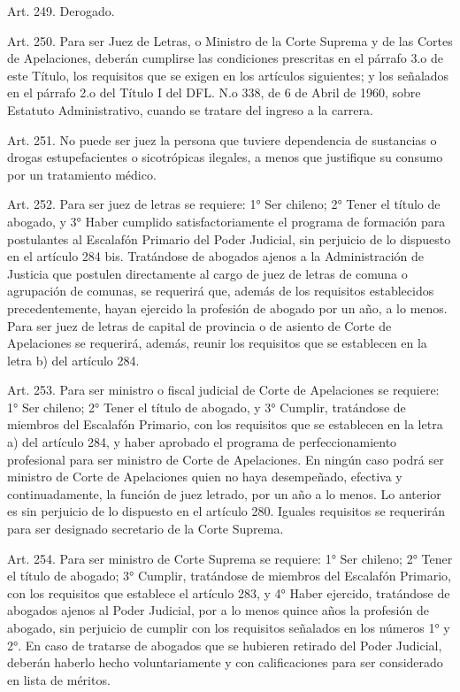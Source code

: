     Art. 249. Derogado.


    Art. 250. Para ser Juez de Letras, o Ministro de la Corte Suprema y de las Cortes de Apelaciones, deberán cumplirse las condiciones prescritas en el párrafo 3.o de este Título, los requisitos que se exigen en los artículos siguientes; y los señalados en el párrafo 2.o del Título I del DFL. N.o 338, de 6 de Abril de 1960, sobre Estatuto Administrativo, cuando se tratare del ingreso a la carrera.



    Art. 251. No puede ser juez la persona que tuviere dependencia de sustancias o drogas estupefacientes o sicotrópicas ilegales, a menos que justifique su consumo por un tratamiento médico.


    Art. 252. Para ser juez de letras se requiere:
    1° Ser chileno;
    2° Tener el título de abogado, y
    3° Haber cumplido satisfactoriamente el programa de formación para postulantes al Escalafón Primario del Poder Judicial, sin perjuicio de lo dispuesto en el artículo 284 bis.
    Tratándose de abogados ajenos a la Administración de Justicia que postulen directamente al cargo de juez de letras de comuna o agrupación de comunas, se requerirá que, además de los requisitos establecidos precedentemente, hayan ejercido la profesión de abogado por un año, a lo menos.
    Para ser juez de letras de capital de provincia o de asiento de Corte de Apelaciones se requerirá, además, reunir los requisitos que se establecen en la letra b) del artículo 284.


    Art. 253. Para ser ministro o fiscal judicial de Corte de Apelaciones se requiere:
    1° Ser chileno;
    2° Tener el título de abogado, y
    3° Cumplir, tratándose de miembros del Escalafón Primario, con los requisitos que se establecen en la letra a) del artículo 284, y haber aprobado el programa de perfeccionamiento profesional para ser ministro de Corte de Apelaciones. En ningún caso podrá ser ministro de Corte de Apelaciones quien no haya desempeñado, efectiva y continuadamente, la función de juez letrado, por un año a lo menos. Lo anterior es sin perjuicio de lo dispuesto en el artículo 280.
    Iguales requisitos se requerirán para ser designado secretario de la Corte Suprema.



    Art. 254. Para ser ministro de Corte Suprema se requiere:
    1° Ser chileno;
    2° Tener el título de abogado;
    3° Cumplir, tratándose de miembros del Escalafón Primario, con los requisitos que establece el artículo 283, y
    4° Haber ejercido, tratándose de abogados ajenos al Poder Judicial, por a lo menos quince años la profesión de abogado, sin perjuicio de cumplir con los requisitos señalados en los números 1° y 2°. En caso de tratarse de abogados que se hubieren retirado del Poder Judicial, deberán haberlo hecho voluntariamente y con calificaciones para ser considerado en lista de méritos.

